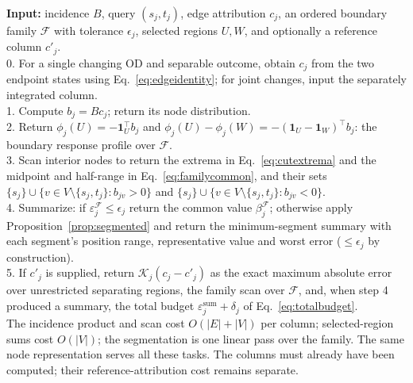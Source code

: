 \documentclass[a4paper,fleqn]{cas-sc}
\begin{document}
\begin{algo}[t]
\caption{From an OD demand change to a delivered spatial explanation}\label{alg:spatial}
\small
\textbf{Input:} incidence $B$, query $(s_j,t_j)$, edge attribution $c_j$,
an ordered boundary family $\mathcal F$ with tolerance $\epsilon_j$,
selected regions $U,W$, and optionally a reference column $c'_j$.\\
0. For a single changing OD and separable outcome, obtain $c_j$ from the two endpoint states using Eq.~\eqref{eq:edgeidentity}; for joint changes, input the separately integrated column.\\
1. Compute $b_j=Bc_j$; return its node distribution.\\
2. Return $\phi_j(U)=-\mathbf1_U^\top b_j$ and
$\phi_j(U)-\phi_j(W)=-(\mathbf1_U-\mathbf1_W)^\top b_j$: the boundary
response profile over $\mathcal F$.\\
3. Scan interior nodes to return the extrema in Eq.~\eqref{eq:cutextrema}
and the midpoint and half-range in Eq.~\eqref{eq:familycommon},
and their sets $\{s_j\}\cup\{v\in V\setminus\{s_j,t_j\}:b_{jv}>0\}$ and
$\{s_j\}\cup\{v\in V\setminus\{s_j,t_j\}:b_{jv}<0\}$.\\
4. Summarize: if $\varepsilon_j^{\mathcal F}\le\epsilon_j$ return the common
value $\beta_j^{\mathcal F}$; otherwise apply
Proposition~\ref{prop:segmented} and return the minimum-segment
summary with each segment's position range, representative value and
worst error ($\le\epsilon_j$ by construction).\\
5. If $c'_j$ is supplied, return $\mathcal K_j(c_j-c'_j)$ as the exact
maximum absolute error over unrestricted separating regions, the family
scan over $\mathcal F$, and, when step 4 produced a summary, the total
budget $\varepsilon^{\mathrm{sum}}_j+\delta_j$ of
Eq.~\eqref{eq:totalbudget}.\\
The incidence product and scan cost $O(|E|+|V|)$ per column; selected-region
sums cost $O(|V|)$; the segmentation is one linear pass over the family.
The same node representation serves all these tasks. The columns must already
have been computed; their reference-attribution cost remains separate.
\end{algo}
\end{document}
